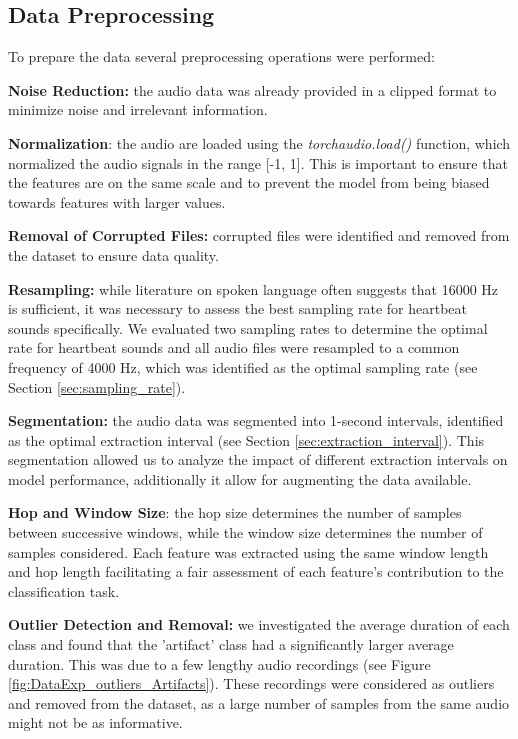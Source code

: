 \subsection{Data Preprocessing}
To prepare the data several preprocessing operations were performed:

\vspace{0.2cm}\noindent
\textbf{Noise Reduction:} the audio data was already provided in a clipped format 
to minimize noise and irrelevant information.

\vspace{0.2cm}\noindent
\textbf{Normalization}: the audio are loaded using the \textit{torchaudio.load()} 
function, which normalized the audio signals in the range [-1, 1]. This is important 
to ensure that the features are on the same scale and to prevent the model from being 
biased towards features with larger values.

\vspace{0.2cm}\noindent
\textbf{Removal of Corrupted Files:} corrupted files were identified and removed 
from the dataset to ensure data quality.

\vspace{0.2cm}\noindent
\textbf{Resampling:} while literature on spoken language often suggests that 16000 Hz is sufficient, 
it was necessary to assess the best sampling rate for heartbeat sounds specifically. 
We evaluated two sampling rates to determine the optimal rate for heartbeat sounds and all audio 
files were resampled to a common frequency of 4000 Hz, 
which was identified as the optimal sampling rate (see Section \ref{sec:sampling_rate}).

\vspace{0.2cm}\noindent
\textbf{Segmentation:} the audio data was segmented into 1-second intervals, 
identified as the optimal extraction interval (see Section \ref{sec:extraction_interval}).
This segmentation allowed us to analyze the impact of different extraction intervals on model 
performance, additionally it allow for augmenting the data available. 

\vspace{0.2cm}\noindent
\textbf{Hop and Window Size}: the hop size determines the number of samples between 
successive windows, while the window size determines the number of samples considered. 
Each feature was extracted using the same window length and hop length facilitating a 
fair assessment of each feature's contribution to the classification task. 


\vspace{0.2cm}\noindent
\textbf{Outlier Detection and Removal:} we investigated the average duration of 
each class and found that the 'artifact' class had a significantly larger average 
duration. This was due to a few lengthy audio 
recordings (see Figure \ref{fig:DataExp_outliers_Artifacts}). These recordings were 
considered as outliers and removed from the dataset, as a large number of samples from 
the same audio might not be as informative.

